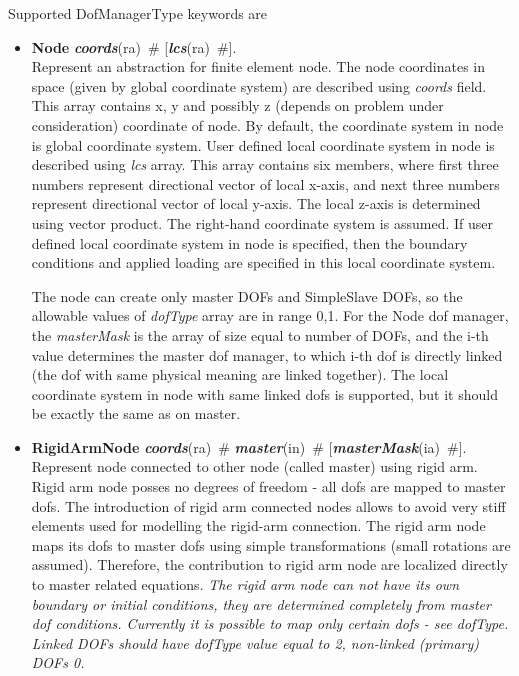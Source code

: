 \documentclass[draft]{article}
\newcommand{\param}[1]{{\em #1}}
\newcommand{\keywordnotype}[1]{\mbox{{\it{\bf{#1}}}}}
\newcommand{\keyword}[2]{\mbox{{\keywordnotype{#1}\tiny (#2)}}}
\newcommand{\entKeywordInst}[1]{\mbox{{\bf{{#1}}}}}
\newcommand{\field}[2]{\mbox{\keyword{#1}{#2}~\#}}
\newcommand{\optField}[2]{\mbox{[\field{#1}{#2}]}}
\begin{document}
Supported DofManagerType keywords are
\begin{itemize}
\item
\entKeywordInst{Node}  \field{coords}{ra}
[\field{lcs}{ra}].\\
Represent an abstraction for finite element node.
The node
coordinates in space (given by global coordinate system) are described
using \param{coords} field. This array contains x, y and possibly z
(depends on problem under consideration) coordinate of node. 
By default, the coordinate system in node is global coordinate system.
User defined local coordinate system in node is described using \param{lcs} array. This
array contains six members, where first three numbers represent
directional vector of local x-axis, and next three numbers represent
directional vector of local y-axis. The local z-axis is determined
using vector product. The right-hand coordinate system is assumed.
If user defined local coordinate system in node is specified, then the
 boundary conditions and applied loading are specified in this local coordinate system. 

The node can create only master DOFs and SimpleSlave DOFs, so the
allowable values of \param{dofType} array are in range {0,1}.
For the Node dof manager, the \param{masterMask} is the array of size
equal to number of DOFs, and the i-th value determines the
master dof manager, to which i-th dof is directly linked (the dof with
same physical meaning are linked together).
The local coordinate
system in node with same linked dofs is supported, but it should be exactly the
same as on master. 


\item
\entKeywordInst{RigidArmNode} \field{coords}{ra}
\field{master}{in} \optField{masterMask}{ia}.\\
Represent node connected to other node (called master) using rigid
arm. Rigid arm node posses no degrees of freedom	- all dofs are mapped to master
dofs. The introduction of rigid arm connected nodes allows to avoid very
stiff elements used for modelling the rigid-arm connection. 
The rigid
arm node maps its dofs to master dofs using simple transformations
(small rotations are assumed). Therefore, the contribution to rigid
arm node are localized directly to master related equations. 
{\em The rigid arm node can not have its own boundary or initial conditions, they are
determined completely from master dof conditions. Currently it is 
possible to map only certain dofs - see \param{dofType}. Linked DOFs
should have dofType value equal to 2, non-linked (primary) DOFs 0.} 


\end{itemize}
\end{document}
